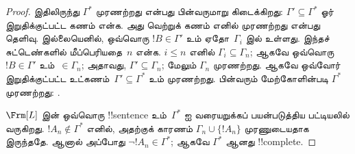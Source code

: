 \documentclass[../../../include/open-logic-section]{subfiles}
\begin{document}
\begin{proof}
இதிலிருந்து $\Gamma^*$ முரணற்றது என்பது பின்வருமாறு கிடைக்கிறது:
$\Gamma' \subseteq \Gamma^*$ ஓர் இறுதிக்குட்பட்ட கணம் என்க. அது வெற்றுக்
கணம் எனில் முரணற்றது என்பது தெளிவு. இல்லையெனில், ஒவ்வொரு
$!B \in \Gamma'$ உம் ஏதோ~$\Gamma_i$ இல் உள்ளது. இந்தச் சுட்டெண்களில்
மீப்பெரியதை~$n$ என்க. $i \le n$ எனில் $\Gamma_i \subseteq \Gamma_n$;
ஆகவே ஒவ்வொரு $!B \in \Gamma'$ உம்~$\in \Gamma_n$; அதாவது,
$\Gamma' \subseteq \Gamma_n$; மேலும் $\Gamma_n$ முரணற்றது. ஆகவே
ஒவ்வோர் இறுதிக்குட்பட்ட உட்கணம்~$\Gamma' \subseteq \Gamma^*$ உம் முரணற்றது.
பின்வரும் மேற்கோளின்படி $\Gamma^*$ முரணற்றது:
.

$\Frm[L]$ இன் ஒவ்வொரு !!{sentence} உம்~$\Gamma^*$ ஐ வரையறுக்கப் பயன்படுத்திய
பட்டியலில் வருகிறது. $!A_n \notin \Gamma^*$ எனில், அதற்குக் காரணம்
$\Gamma_n \cup \{!A_n\}$ முரணுடையதாக இருந்ததே. ஆனால் அப்போது
$\lnot !A_n \in \Gamma^*$; ஆகவே $\Gamma^*$ ஆனது !!{complete}.
\end{proof}
\end{document}
